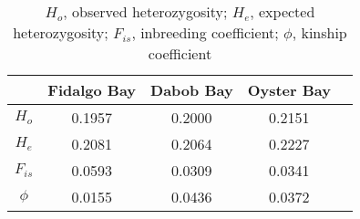 \documentclass[fleqn,10pt]{wlscirep}
\begin{document}
\begin{table}[H]
\centering
\begin{tabular}{SSSSS}\toprule
    { } & {Fidalgo Bay} & {Dabob Bay} & {Oyster Bay} \\ \midrule
    {$H_o$} & 0.1957    & 0.2000 & 0.2151 \\ 
    {$H_e$} & {0.2081} & {0.2064} & 0.2227 \\
    {$F_{is}$} & 0.0593 & 0.0309 & 0.0341\\
    {$\phi$} & 0.0155 & 0.0436 & 0.0372 \\ \bottomrule
\end{tabular}
\caption{$H_o$, observed heterozygosity; $H_e$, expected heterozygosity; $F_{is}$, inbreeding coefficient; $\phi$, kinship coefficient} \label{tab:Table 1}
\end{table}
\end{document}
